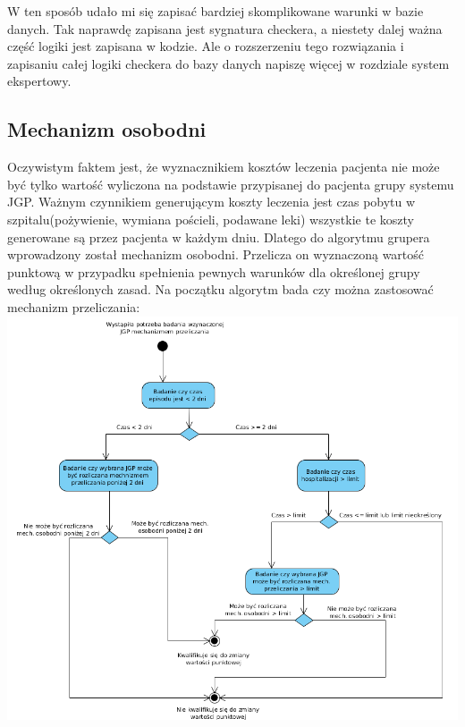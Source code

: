W ten sposób udało mi się zapisać bardziej skomplikowane warunki w bazie danych. Tak naprawdę zapisana jest sygnatura checkera, a niestety dalej ważna część logiki jest zapisana w kodzie. Ale o rozszerzeniu tego rozwiązania  i zapisaniu całej logiki checkera do bazy danych napiszę więcej w rozdziale system ekspertowy.

\subsection{Mechanizm osobodni}
\label{sec:mechanizmOsobodni}
Oczywistym faktem jest, że wyznacznikiem kosztów leczenia pacjenta nie może być tylko wartość wyliczona na podstawie przypisanej do pacjenta grupy systemu JGP. Ważnym czynnikiem generującym koszty leczenia jest czas pobytu w szpitalu(pożywienie, wymiana pościeli, podawane leki) wszystkie te koszty generowane są przez pacjenta w każdym dniu. Dlatego do algorytmu grupera wprowadzony został mechanizm osobodni. Przelicza on wyznaczoną wartość punktową w przypadku spełnienia pewnych warunków dla określonej grupy według określonych zasad. Na początku algorytm bada czy można zastosować mechanizm przeliczania:
\includegraphics[scale=0.5]{images/activity-manday}

